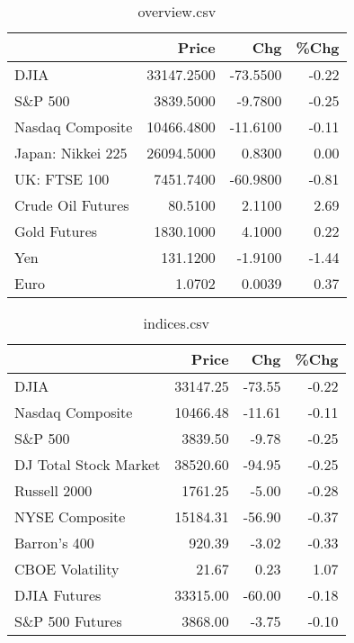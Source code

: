 \documentclass{article}%
\begin{document}
\begin{table}[htbp]%
\caption{overview.csv}%
\centering%
\begin{adjustbox}{width=1\textwidth}%
\begin{tabular}{lrrr}
\toprule
                  &      Price &      Chg &  \%Chg \\
\midrule
             DJIA & 33147.2500 & -73.5500 & -0.22 \\
          S\&P 500 &  3839.5000 &  -9.7800 & -0.25 \\
 Nasdaq Composite & 10466.4800 & -11.6100 & -0.11 \\
Japan: Nikkei 225 & 26094.5000 &   0.8300 &  0.00 \\
     UK: FTSE 100 &  7451.7400 & -60.9800 & -0.81 \\
Crude Oil Futures &    80.5100 &   2.1100 &  2.69 \\
     Gold Futures &  1830.1000 &   4.1000 &  0.22 \\
              Yen &   131.1200 &  -1.9100 & -1.44 \\
             Euro &     1.0702 &   0.0039 &  0.37 \\
\bottomrule
\end{tabular}
%
\end{adjustbox}%
\end{table}

%


\begin{table}[htbp]%
\caption{indices.csv}%
\centering%
\begin{adjustbox}{width=1\textwidth}%
\begin{tabular}{lrrr}
\toprule
                      &    Price &    Chg &  \%Chg \\
\midrule
                 DJIA & 33147.25 & -73.55 & -0.22 \\
     Nasdaq Composite & 10466.48 & -11.61 & -0.11 \\
              S\&P 500 &  3839.50 &  -9.78 & -0.25 \\
DJ Total Stock Market & 38520.60 & -94.95 & -0.25 \\
         Russell 2000 &  1761.25 &  -5.00 & -0.28 \\
       NYSE Composite & 15184.31 & -56.90 & -0.37 \\
         Barron's 400 &   920.39 &  -3.02 & -0.33 \\
      CBOE Volatility &    21.67 &   0.23 &  1.07 \\
         DJIA Futures & 33315.00 & -60.00 & -0.18 \\
      S\&P 500 Futures &  3868.00 &  -3.75 & -0.10 \\
\bottomrule
\end{tabular}
%
\end{adjustbox}%
\end{table}
\end{document}
